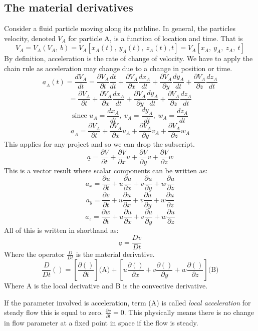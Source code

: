 \documentclass[class=report, crop=false, 12pt,a4paper]{standalone}
\begin{document}
\subsection{The material derivatives}
Consider a fluid particle moving along its pathline. In general, the particles velocity, denoted \(V_A\) for particle A, is a function of location and time. That is
\[ V_A = V_A(V_A, \ b) = V_A \left[ x_A(t), \ y_A(t), \ z_A(t), t \right] = V_A \left[ x_A, \ y_A, \ z_A,\  t \right] 
\]
By definition, acceleration is the rate of change of velocity. We have to apply the chain rule as acceleration may change due to a change in position or time. 
\[ \underline{a}_A(t) = \frac{dV_A}{dt} = \frac{\partial V_A}{\partial t} \frac{dt}{dt} + \frac{\partial V_A}{\partial x} \frac{dx_A}{dt} + \frac{\partial V_A}{\partial y} \frac{dy_A}{dt} + \frac{\partial V_A}{\partial z} \frac{dz_A}{dt} \]
\[ = \frac{\partial V_A}{\partial t} + \frac{\partial V_A}{\partial x} \frac{dx_A}{dt} + \frac{\partial V_A}{\partial y} \frac{dy_A}{dt} + \frac{\partial V_A}{\partial z} \frac{dz_A}{dt} \]
\[ \textrm{since } u_A = \frac{dx_A}{dt}, \ v_A = \frac{dy_A}{dt}, \ w_A = \frac{dz_A}{dt} \]
\[ \underline{a}_A = \frac{\partial V_A}{\partial t} + \frac{\partial V_A}{\partial x} u_A + \frac{\partial V_A}{\partial y} v_A + \frac{\partial V_A}{\partial z} w_A \]
This applies for any project and so we can drop the subscript.
\[ \underline{a} = \frac{\partial V}{\partial t} + \frac{\partial V}{\partial x} u + \frac{\partial V}{\partial y} v + \frac{\partial V}{\partial z} w \]
This is a vector result where scalar components can be written as:
\[ a_x = \frac{\partial u}{\partial t} + u\frac{\partial u}{\partial x} + v\frac{\partial u}{\partial y} + w\frac{\partial u}{\partial z} \]
\[ a_y = \frac{\partial v}{\partial t} + u\frac{\partial u}{\partial x} + v\frac{\partial u}{\partial y} + w\frac{\partial u}{\partial z} \]
\[ a_z = \frac{\partial w}{\partial t} + u\frac{\partial u}{\partial x} + v\frac{\partial u}{\partial y} + w\frac{\partial u}{\partial z} \]
All of this is written in shorthand as:
\[ \underline{a} = \frac{Dv}{Dt} \]
Where the operator \( \frac{D}{Dt}\) is the material derivative. 
\[ \frac{D}{Dt}() = \left[\frac{\partial ()}{\partial t} \right] \textrm{(A)} + \left[u\frac{\partial ()}{\partial x} + v\frac{\partial ()}{\partial y} + w\frac{\partial ()}{\partial z} \right] \textrm{(B)} \]
Where A is the local derivative and B is the convective derivative. 

If the parameter involved is acceleration, term (A) is called \emph{local acceleration} for steady flow this is equal to zero. \( \frac{\partial v}{\partial t} = 0 \). This physically means there is no change in flow parameter at a fixed point in space if the flow is steady. 
\end{document}
